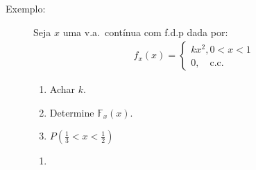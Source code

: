 \documentclass[11pt,a4paper]{book}
\begin{document}
 \begin{description}

   \item [Exemplo:] 
     Seja $x$ uma v.a.\ contínua com f.d.p dada por:
     \begin{align*}
       f_{x}(x) = 
       \begin{cases} 
         k x^2, 0 < x < 1 \\
         0, \quad \text{c.c.\ }
       \end{cases}
     \end{align*}
     \begin{enumerate}[label=(\alph*)]
       \item Achar $k$.
       \item Determine $\mathbb{F}_{x} (x)$.
       \item $P (\frac{1}{3} < x < \frac{1}{2})$
     \end{enumerate} 

     \begin{enumerate}[label=(\alph*)]
       \item 


\end{enumerate}
\end{description}
\end{document}
